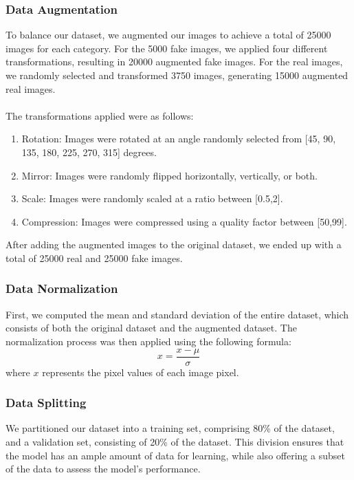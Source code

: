     \subsubsection{Data Augmentation}
    To balance our dataset, we augmented our images to achieve a total of 25000 images for each category. For the 5000 fake images, we applied four different transformations, resulting in 20000 augmented fake images. For the real images, we randomly selected and transformed 3750 images, generating 15000 augmented real images. \\\\
    The transformations applied were as follows:
    \begin{enumerate}
        \item Rotation: Images were rotated at an angle randomly selected from [45, 90, 135, 180, 225, 270, 315] degrees.
        \item Mirror: Images were randomly flipped horizontally, vertically, or both.
        \item Scale: Images were randomly scaled at a ratio between [0.5,2].
        \item Compression: Images were compressed using a quality factor between [50,99].
    \end{enumerate}
    After adding the augmented images to the original dataset, we ended up with a total of 25000 real and 25000 fake images.

    \subsubsection{Data Normalization}
        First, we computed the mean and standard deviation of the entire dataset, which consists of both the original dataset and the augmented dataset. The normalization process was then applied using the following formula:
        \begin{equation}
        x = \frac{x - \mu}{\sigma}
        \end{equation}
        where \(x\) represents the pixel values of each image pixel.

    \subsubsection{Data Splitting}
        We partitioned our dataset into a training set, comprising 80\% of the dataset, and a validation set, consisting of 20\% of the dataset. This division ensures that the model has an ample amount of data for learning, while also offering a subset of the data to assess the model's performance.

